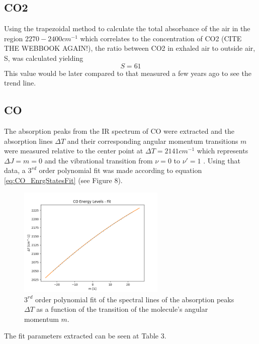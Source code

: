 \documentclass[reprint,amsmath,amssymb,aps, prl]{revtex4-2}
\begin{document}
\subsection{\label{subsec:level20} CO2}
Using the trapezoidal method to calculate the total absorbance of the air in the region $2270-2400cm^{-1}$ which correlates to the concentration of CO2 (CITE THE WEBBOOK AGAIN!), the ratio between CO2 in exhaled air to outside air, S,  was calculated yielding 
\begin{equation}
\label{eq:CO2ratio}
S=61
\end{equation}
This value would be later compared to that measured a few years ago to see the trend line.  
\subsection{\label{subsec:level21}CO}
The absorption peaks from the IR spectrum of CO were extracted and the absorption lines $\Delta T$ and their corresponding angular momentum transitions $m$ were measured relative to the center point at $\Delta T=2141 cm^{-1}$ which represents $\Delta J = m = 0 $ and the vibrational transition from $\nu =0$ to $\nu' =1$ . Using that data, a $3^{rd}$ order polynomial fit was made according to equation \ref{eq:CO_EnrgStatesFit} (see Figure 8). 
\begin{figure}[h!]
    \includegraphics[width=7cm]{Images/polynomial_3_fitting.png}
    \caption{$3^{rd}$ order polynomial fit of the spectral lines of the absorption peaks $\Delta T$ as a function of the transition of the molecule's angular momentum $m$. }
    \label{fig:COPolynomialfit}
    \centering
\end{figure}
The fit parameters extracted can be seen at Table 3. 
\end{document}
